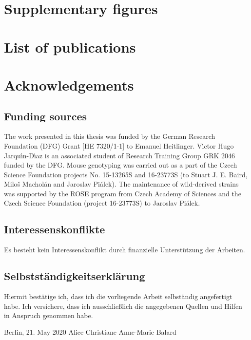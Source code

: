 \documentclass[11pt]{report}
\numberwithin{equation}{section} %
\begin{document}
\newpage
\printbibliography[heading=bibintoc]

\chapter*{Supplementary figures}


\chapter*{List of publications}


\chapter*{Acknowledgements}


\newpage

\section*{Funding sources}

The work presented in this thesis was funded by the German Research Foundation (DFG) Grant [HE 7320/1-1] to Emanuel Heitlinger. V{\'{\i}}ctor Hugo Jarqu{\'{\i}}n-D{\'{\i}}az is an associated student of Research Training Group GRK 2046 funded by the DFG. Mouse genotyping was carried out as a part of the Czech Science Foundation projects No. 15-13265S and 16-23773S (to Stuart J. E. Baird, Milo{\v{s}} Machol{\'{a}}n and Jaroslav Pi{\'{a}}lek). The maintenance of wild-derived strains was supported by the ROSE program from Czech Academy of Sciences and the Czech Science Foundation (project 16-23773S) to Jaroslav Pi{\'{a}}lek.

\section*{Interessenskonflikte}

Es besteht kein Interessenskonflikt durch finanzielle Unterstützung der Arbeiten.

\section*{Selbstständigkeitserklärung}

Hiermit bestätige ich, dass ich die vorliegende Arbeit selbständig angefertigt habe. Ich versichere, dass ich ausschließlich die angegebenen Quellen und Hilfen in Anspruch genommen habe.
\par
Berlin, 21. May 2020 \hfill Alice Christiane Anne-Marie Balard
\end{document}
